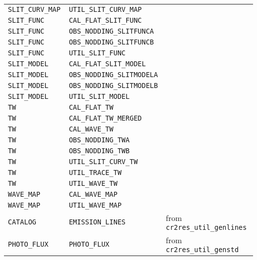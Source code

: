 \begin{tabular}{|l|l|l|}
\texttt{SLIT\_CURV\_MAP    } & \texttt{UTIL\_SLIT\_CURV\_MAP}          & \\
\texttt{SLIT\_FUNC        } & \texttt{CAL\_FLAT\_SLIT\_FUNC}          & \\
\texttt{SLIT\_FUNC        } & \texttt{OBS\_NODDING\_SLITFUNCA}       & \\
\texttt{SLIT\_FUNC        } & \texttt{OBS\_NODDING\_SLITFUNCB}       & \\
\texttt{SLIT\_FUNC        } & \texttt{UTIL\_SLIT\_FUNC}              & \\
\texttt{SLIT\_MODEL       } & \texttt{CAL\_FLAT\_SLIT\_MODEL}         & \\
\texttt{SLIT\_MODEL       } & \texttt{OBS\_NODDING\_SLITMODELA}      & \\
\texttt{SLIT\_MODEL       } & \texttt{OBS\_NODDING\_SLITMODELB}      & \\
\texttt{SLIT\_MODEL       } & \texttt{UTIL\_SLIT\_MODEL}             & \\
\texttt{TW               } & \texttt{CAL\_FLAT\_TW}                 & \\
\texttt{TW               } & \texttt{CAL\_FLAT\_TW\_MERGED}          & \\
\texttt{TW               } & \texttt{CAL\_WAVE\_TW}                 & \\
\texttt{TW               } & \texttt{OBS\_NODDING\_TWA}             & \\
\texttt{TW               } & \texttt{OBS\_NODDING\_TWB}             & \\
\texttt{TW               } & \texttt{UTIL\_SLIT\_CURV\_TW}           & \\
\texttt{TW               } & \texttt{UTIL\_TRACE\_TW}               & \\
\texttt{TW               } & \texttt{UTIL\_WAVE\_TW}                & \\
\texttt{WAVE\_MAP         } & \texttt{CAL\_WAVE\_MAP}                & \\
\texttt{WAVE\_MAP         } & \texttt{UTIL\_WAVE\_MAP}               & \\
\texttt{CATALOG  } & \texttt{EMISSION\_LINES}               & from \texttt{cr2res\_util\_genlines} \\
\texttt{PHOTO\_FLUX  } & \texttt{PHOTO\_FLUX}               &  from \texttt{cr2res\_util\_genstd} \\
\hline
\end{tabular}
\label{tab:cal-prods}

\pagebreak


